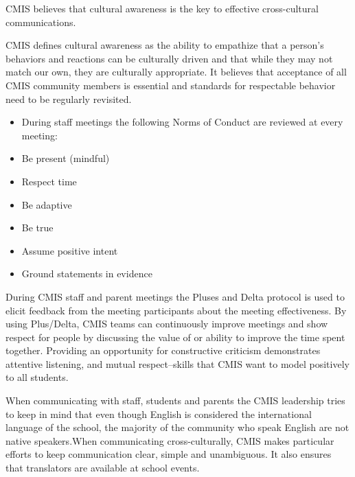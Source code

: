 

\begin{findings}
CMIS believes that cultural awareness is the key to effective cross-cultural communications. 

CMIS defines cultural awareness as the ability to empathize that a person's behaviors and reactions can be culturally driven and that while they may not match our own, they are culturally appropriate. It believes that acceptance of all CMIS community members is essential and standards for respectable behavior need to be regularly revisited. 


\begin{itemize}
\item During staff meetings the following Norms of Conduct are reviewed at every meeting:
\item Be present (mindful)
\item Respect time
\item Be adaptive
\item Be true
\item Assume positive intent
\item Ground statements in evidence
\end{itemize}

During CMIS staff and parent meetings the Pluses and Delta protocol is used to elicit feedback from the meeting participants about the meeting effectiveness. By using Plus/Delta, CMIS teams can continuously improve meetings and show respect for people by discussing the value of or ability to improve the time spent together. Providing an opportunity for constructive criticism demonstrates attentive listening, and mutual respect--skills that CMIS want to model positively to all  students.

When communicating with staff, students and parents the CMIS leadership tries to keep in mind that even though English is considered the international language of the school, the majority of the community who speak English are not native speakers.When communicating cross-culturally, CMIS makes particular efforts to keep communication clear, simple and unambiguous. It also ensures that translators are available at school events.


\end{findings}
